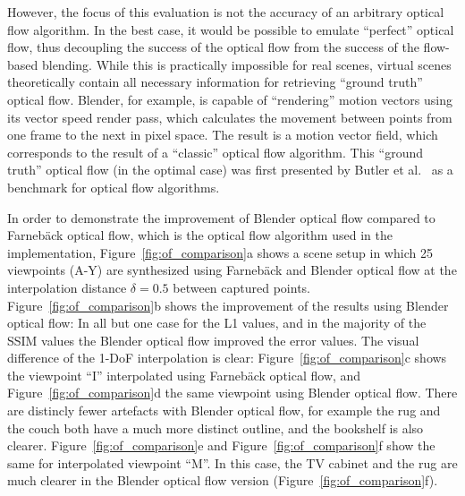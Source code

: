 However, the focus of this evaluation is not the accuracy of an arbitrary optical flow algorithm. In the best case, it would be possible to emulate ``perfect'' optical flow, thus decoupling the success of the optical flow from the success of the flow-based blending. While this is practically impossible for real scenes, virtual scenes theoretically contain all necessary information for retrieving ``ground truth'' optical flow. Blender, for example, is capable of ``rendering'' motion vectors using its vector speed render pass, which calculates the movement between points from one frame to the next in pixel space. The result is a motion vector field, which corresponds to the result of a ``classic'' optical flow algorithm. This ``ground truth'' optical flow (in the optimal case) was first presented by Butler et al.\ \cite{sintel} as a benchmark for optical flow algorithms.

In order to demonstrate the improvement of Blender optical flow compared to Farneb\"ack optical flow, which is the optical flow algorithm used in the implementation, Figure~\ref{fig:of_comparison}a shows a scene setup in which 25 viewpoints (A-Y) are synthesized using Farneb\"ack and Blender optical flow at the interpolation distance $\delta = 0.5$ between captured points. 
Figure~\ref{fig:of_comparison}b shows the improvement of the results using Blender optical flow: In all but one case for the L1 values, and in the majority of the SSIM values the Blender optical flow improved the error values. The visual difference of the 1-DoF interpolation is clear: Figure~\ref{fig:of_comparison}c shows the viewpoint ``I'' interpolated using Farneb\"ack optical flow, and Figure~\ref{fig:of_comparison}d the same viewpoint using Blender optical flow. There are distincly fewer artefacts with Blender optical flow, for example the rug and the couch both have a much more distinct outline, and the bookshelf is also clearer. Figure~\ref{fig:of_comparison}e and Figure~\ref{fig:of_comparison}f show the same for interpolated viewpoint ``M''. In this case, the TV cabinet and the rug are much clearer in the Blender optical flow version (Figure~\ref{fig:of_comparison}f).

